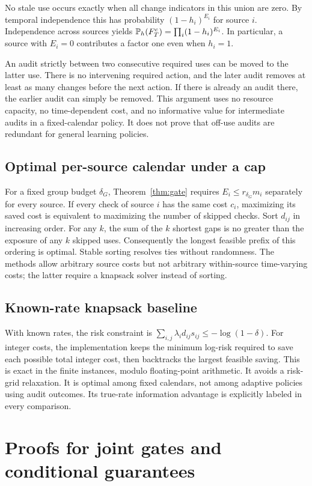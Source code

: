 No stale use occurs exactly when all change indicators in this union are zero. By temporal independence this has probability $(1-h_i)^{E_i}$ for source $i$. Independence across sources yields $\mathbb P_h(F_T^c)=\prod_i(1-h_i)^{E_i}$. In particular, a source with $E_i=0$ contributes a factor one even when $h_i=1$.

An audit strictly between two consecutive required uses can be moved to the latter use. There is no intervening required action, and the later audit removes at least as many changes before the next action. If there is already an audit there, the earlier audit can simply be removed. This argument uses no resource capacity, no time-dependent cost, and no informative value for intermediate audits in a fixed-calendar policy. It does not prove that off-use audits are redundant for general learning policies.

\subsection{Optimal per-source calendar under a cap}
For a fixed group budget $\delta_G$, Theorem~\ref{thm:gate} requires $E_i\leq r_{\delta_G}m_i$ separately for every source. If every check of source $i$ has the same cost $c_i$, maximizing its saved cost is equivalent to maximizing the number of skipped checks. Sort $d_{ij}$ in increasing order. For any $k$, the sum of the $k$ shortest gaps is no greater than the exposure of any $k$ skipped uses. Consequently the longest feasible prefix of this ordering is optimal. Stable sorting resolves ties without randomness. The methods allow arbitrary source costs but not arbitrary within-source time-varying costs; the latter require a knapsack solver instead of sorting.

\subsection{Known-rate knapsack baseline}
With known rates, the risk constraint is $\sum_{i,j}\lambda_i d_{ij}s_{ij}\leq-\log(1-\delta)$. For integer costs, the implementation keeps the minimum log-risk required to save each possible total integer cost, then backtracks the largest feasible saving. This is exact in the finite instances, modulo floating-point arithmetic. It avoids a risk-grid relaxation. It is optimal among fixed calendars, not among adaptive policies using audit outcomes. Its true-rate information advantage is explicitly labeled in every comparison.

\section{Proofs for joint gates and conditional guarantees}\label{app:joint}
